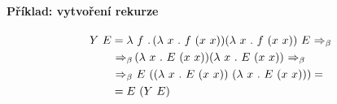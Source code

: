 \paragraph*{Příklad: vytvoření rekurze}
\begin{equation}
    \begin{split}
        Y ~ E &= \lk f \lkdot ( \lk x \lkdot f ~ (x ~ x)) (\lk x \lkdot f ~ (x ~ x)) ~ E \lkbeta \\
        &\lkbeta ( \lk x \lkdot E ~ (x ~ x)) (\lk x \lkdot E ~ (x ~ x)) \lkbeta \\
        &\lkbeta E ~ ((\lk x \lkdot E ~ (x ~ x)) ~ (\lk x \lkdot E ~ (x ~ x))) = \\
        &= E ~ (Y ~ E)
    \end{split}
\end{equation}
